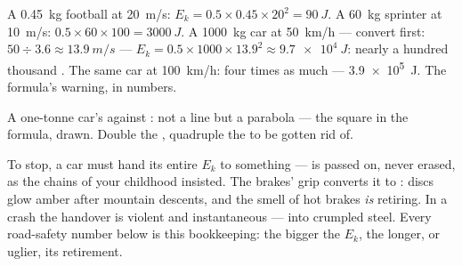 \begin{example}\label{ex:g9:kinetic-energy-safety:first}
A \qty{0.45}{kg} football at \qty{20}{m/s}: $E_k = 0.5 \times
0.45 \times 20^2 = \qty{90}{J}$. A \qty{60}{kg} sprinter at
\qty{10}{m/s}: $0.5 \times 60 \times 100 = \qty{3000}{J}$. A
\qty{1000}{kg} car at \qty{50}{km/h} --- convert first:
$50 \div 3.6 \approx \qty{13.9}{m/s}$ --- $E_k = 0.5 \times
1000 \times 13.9^2 \approx \qty{9.7e4}{J}$: nearly a hundred
thousand . The same car at \qty{100}{km/h}: four times
as much --- \qty{3.9e5}{J}. The formula's warning, in
numbers.
\end{example}

\begin{omfigure}

{\small A one-tonne car's  against : not a
line but a parabola --- the square in the formula, drawn.
Double the , quadruple the  to be gotten rid of.}
\end{omfigure}

\begin{example}\label{ex:g9:kinetic-energy-safety:brakes}
To stop, a car must hand its entire $E_k$ to something ---
 is passed on, never erased, as the chains of your
childhood insisted. The brakes' grip converts it to :
discs glow amber after mountain descents, and the smell of
hot brakes \emph{is}  retiring. In a crash the
handover is violent and instantaneous --- into crumpled
steel. Every road-safety number below is this bookkeeping:
the bigger the $E_k$, the longer, or uglier, its retirement.
\end{example}

